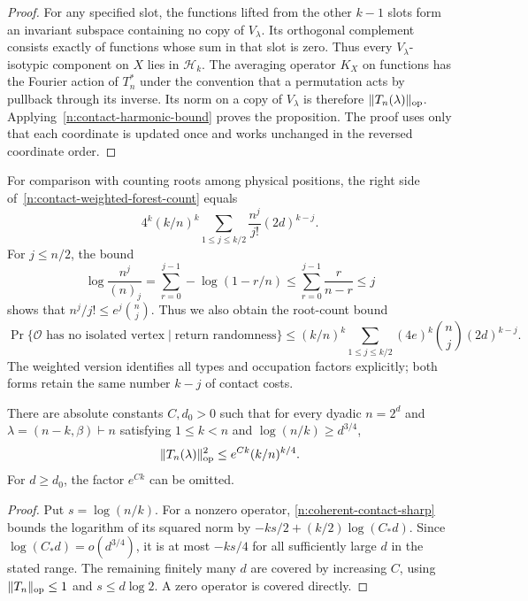 \begin{proof}
For any specified slot, the functions lifted from the other $k-1$
slots form an invariant subspace containing no copy of $V_\lambda$.
Its orthogonal complement consists exactly of functions whose sum
in that slot is zero.  Thus every $V_\lambda$-isotypic component on
$X$ lies in $\mathcal H_k$.  The averaging operator $K_X$ on functions
has the Fourier action of $T_n^*$ under the convention that a
permutation acts by pullback through its inverse.  Its norm on a
copy of $V_\lambda$ is therefore $\|T_n(\lambda)\|_{\mathrm{op}}$.
Applying~\eqref{n:contact-harmonic-bound} proves the proposition.
The proof uses only that each coordinate is updated once and works
unchanged in the reversed coordinate order.
\end{proof}

\begin{remark}
For comparison with counting roots among physical positions, the
right side of~\eqref{n:contact-weighted-forest-count} equals
\[
 4^k(k/n)^k
 \sum_{1\le j\le k/2}\frac{n^j}{j!}(2d)^{k-j}.
\]
For $j\le n/2$, the bound
\[
 \log\frac{n^j}{(n)_j}
 =\sum_{r=0}^{j-1}-\log(1-r/n)
 \le\sum_{r=0}^{j-1}\frac{r}{n-r}\le j
\]
shows that $n^j/j!\le e^j\binom nj$.  Thus we also obtain the
root-count bound
\begin{equation}\label{rec:coherent-forest-count}
 \Pr\{\mathcal O\text{ has no isolated vertex}\mid\text{return randomness}\}
 \le(k/n)^k\sum_{1\le j\le k/2}(4e)^k\binom nj(2d)^{k-j}.
\end{equation}
The weighted version identifies all types and occupation factors
explicitly; both forms retain the same number $k-j$ of contact costs.

\end{remark}

\begin{corollary}
\label{n:coherent-contact-sparse-saving}
There are absolute constants $C,d_0>0$ such that for every dyadic
$n=2^d$ and $\lambda=(n-k,\beta)\vdash n$ satisfying
$1\le k<n$ and $\log(n/k)\ge d^{3/4}$,
\[
 \|T_n(\lambda)\|_{\mathrm{op}}^2
 \le e^{Ck}(k/n)^{k/4}.
\]
For $d\ge d_0$, the factor $e^{Ck}$ can be omitted.
\end{corollary}
\begin{proof}
Put $s=\log(n/k)$.  For a nonzero operator,
\eqref{n:coherent-contact-sharp} bounds the logarithm of its squared norm by
$-ks/2+(k/2)\log(C_*d)$.  Since $\log(C_*d)=o(d^{3/4})$, it is at
most $-ks/4$ for all sufficiently large $d$ in the stated range.
The remaining finitely many $d$ are covered by increasing $C$, using
$\|T_n\|_{\mathrm{op}}\le1$ and $s\le d\log2$.  A zero operator is covered
directly.
\end{proof}

